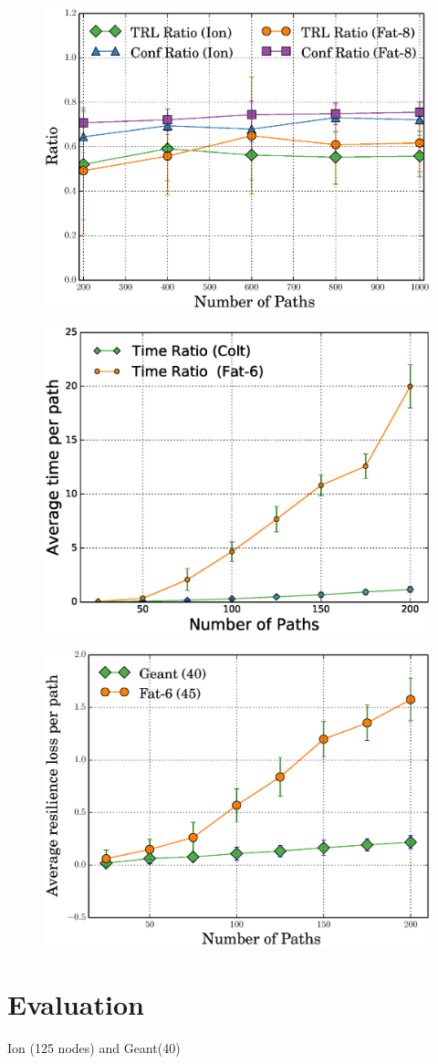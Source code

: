 \begin{figure}[t]
	\centering
	\includegraphics[width=0.7\columnwidth]{figures/ratioMCMC.eps}
	\label{fig:ratiomcmc}
\end{figure}

\begin{figure}[t]
	\centering
	\includegraphics[width=0.7\columnwidth]{figures/ospfTime.eps}
	\label{fig:ospftime}
\end{figure}

\begin{figure}[t]
	\centering
	\includegraphics[width=0.7\columnwidth]{figures/ospfTRL.eps}
	\label{fig:ospfloss}
\end{figure}


\section{Evaluation}
Ion (125 nodes) and Geant(40)

